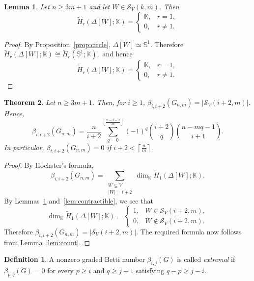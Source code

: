 \documentclass[12pt,reqno]{amsart}
\newtheorem{theorem}{Theorem}[section]
\newtheorem{lemma}[theorem]{Lemma}
\theoremstyle{definition}
\newtheorem{definition}{Definition}
\numberwithin{equation}{section}
\def\K{\mathbb{K}}
\begin{document}
\begin{lemma}\label{lem:circle}
	Let $n\geq3m+1$ and let \( W\in\mathcal{S}_V(k,m). \)
	Then
	\[
	\widetilde H_r(\Delta[W];\K)
	=
	\begin{cases}
		\K,&r=1,\\
		0,&r\neq1.
	\end{cases}
	\]
\end{lemma}

\begin{proof}
	By Proposition~\ref{prop:circle}, \( \Delta[W]\simeq\mathbb S^1. \)
	Therefore \( 	\widetilde H_r(\Delta[W];\K)
	\cong
	\widetilde H_r(\mathbb S^1;\K), \)
	and hence
	\[
	\widetilde H_r(\Delta[W];\K)
	=
	\begin{cases}
		\K,&r=1,\\
		0,&r\neq1.
	\end{cases}
	\]
\end{proof}


\begin{theorem}\label{thm:betti2}
Let $n\geq3m+1$. Then, for $i\geq1$, \( \beta_{i,i+2}(G_{n,m})
=
\left|\mathcal{S}_V(i+2,m)\right|. \)
Hence,
\[
{
\beta_{i,i+2}(G_{n,m})
=
\frac{n}{i+2}
\sum_{q=0}^{\left\lfloor\frac{n-i-2}{m}\right\rfloor}
(-1)^q
\binom{i+2}{q}
\binom{n-mq-1}{i+1}
}.
\]
In particular, \( \beta_{i,i+2}(G_{n,m})=0 \) if \( i+2<\left\lceil\frac{n}{m}\right\rceil. \)

\end{theorem}

\begin{proof}
By Hochster's formula,
\[
\beta_{i,i+2}(G_{n,m})
=
\sum_{\substack{W\subseteq V\\|W|=i+2}}
\dim_{\K}\widetilde H_1(\Delta[W];\K).
\]
By Lemmas~\ref{lem:circle} and~\ref{lem:contractible}, we see that
\[
\dim_{\K}\widetilde H_1(\Delta[W];\K)
=
\begin{cases}
1,&W\in\mathcal{S}_V(i+2,m),\\
0,&W\notin\mathcal{S}_V(i+2,m).
\end{cases}
\]
Therefore \( \beta_{i,i+2}(G_{n,m})
=
|\mathcal{S}_V(i+2,m)|. \)
The required formula now follows from Lemma~\ref{lem:count}.
\end{proof}

\begin{definition}
	A nonzero graded Betti number $\beta_{i,j}(G)$ is called
	\emph{extremal} if \( \beta_{p,q}(G)=0 \)
	for every $p\geq i$ and $q\geq j+1$ satisfying
	\( q-p\geq j-i. \)
\end{definition}
\end{document}
